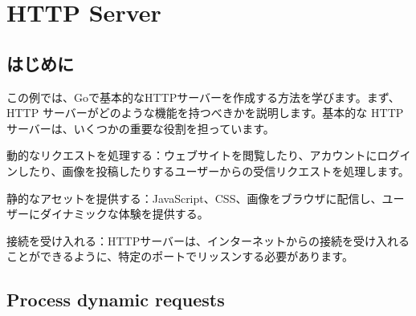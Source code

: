 \section{HTTP Server}

\subsection{はじめに}

この例では、Goで基本的なHTTPサーバーを作成する方法を学びます。まず、HTTP サーバーがどのような機能を持つべきかを説明します。基本的な HTTP サーバーは、いくつかの重要な役割を担っています。

動的なリクエストを処理する：ウェブサイトを閲覧したり、アカウントにログインしたり、画像を投稿したりするユーザーからの受信リクエストを処理します。

静的なアセットを提供する：JavaScript、CSS、画像をブラウザに配信し、ユーザーにダイナミックな体験を提供する。

接続を受け入れる：HTTPサーバーは、インターネットからの接続を受け入れることができるように、特定のポートでリッスンする必要があります。

\subsection{Process dynamic requests}


